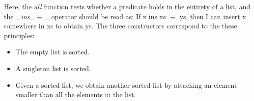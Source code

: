 \documentclass[12pt,twoside,notitlepage]{report}
\begin{document}
\begin{code}
\\
\>[0]\<[2]%
\>[2]  \AgdaSymbol{:} \AgdaSymbol{\{} \AgdaSymbol{:} \AgdaSymbol{\}}       \<%
\\
\>[2]\<[4]%
\>[4]\AgdaInductiveConstructor{[]} \AgdaSymbol{:}  \AgdaInductiveConstructor{[]}\<%
\\
\>[2]\<[4]%
\>[4]\AgdaInductiveConstructor{[\_]} \AgdaSymbol{:} \AgdaSymbol{(} \AgdaSymbol{:} \AgdaSymbol{)}   \AgdaSymbol{(}  \AgdaInductiveConstructor{[]}\AgdaSymbol{)}\<%
\\
\>[2]\<[4]%
\>[4] \AgdaSymbol{:}  \AgdaSymbol{\{} \AgdaSymbol{:} \AgdaSymbol{\}} \AgdaSymbol{\{} \AgdaSymbol{:}   \AgdaSymbol{\}} \AgdaSymbol{\{}\AgdaSymbol{\}}\<%
\\
\>[4]\<[10]%
\>[10] \AgdaSymbol{(} \AgdaSymbol{:} \AgdaSymbol{)}\<%
\\
\>[4]\<[10]%
\>[10] \AgdaSymbol{(} \AgdaSymbol{:}  \AgdaSymbol{)}\<%
\\
\>[4]\<[10]%
\>[10] \AgdaSymbol{(}      \AgdaSymbol{)}   \AgdaSymbol{)}\<%
\\
\>[4]\<[10]%
\>[10] \AgdaSymbol{(}    \AgdaSymbol{)}\<%
\\
\>[4]\<[10]%
\>[10] \AgdaSymbol{(} \AgdaSymbol{)}\<%
\\
\end{code}

Here, the \textit{all} function tests whether a predicate holds in the entirety of a list, and the \textit{\_ins\_$\equiv$\_} operator should be read as: If x ins xs $\equiv$ ys, then I can insert x somewhere in xs to obtain ys. The three constructors correspond to the these principles: 
\begin{itemize}
\item The empty list is sorted.
\item A singleton list is sorted.
\item Given a sorted list, we obtain another sorted list by attaching an element smaller than all the elements in the list.
\end{itemize}
\end{document}
